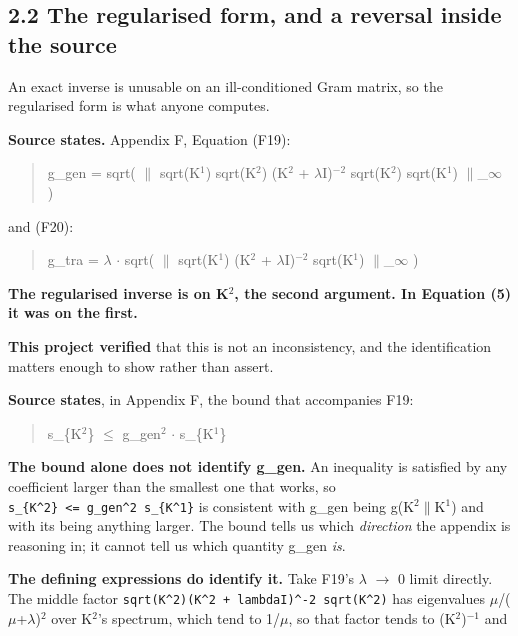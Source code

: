 \documentclass[
  10pt,
]{article}
\begin{document}
\subsection{2.2 The regularised form, and a reversal inside the
source}\label{the-regularised-form-and-a-reversal-inside-the-source}

An exact inverse is unusable on an ill-conditioned Gram matrix, so the
regularised form is what anyone computes.

\textbf{Source states.} Appendix F, Equation (F19):

\begin{quote}
g\_gen = sqrt( \(\|\) sqrt(K\(^{1}\)) sqrt(K\(^{2}\)) (K\(^{2}\) +
\(\lambda\)I)\(^{-2}\) sqrt(K\(^{2}\)) sqrt(K\(^{1}\))
\(\|\)\_\(\infty\) )
\end{quote}

and (F20):

\begin{quote}
g\_tra = \(\lambda\) \(\cdot\) sqrt( \(\|\) sqrt(K\(^{1}\)) (K\(^{2}\) +
\(\lambda\)I)\(^{-2}\) sqrt(K\(^{1}\)) \(\|\)\_\(\infty\) )
\end{quote}

\textbf{The regularised inverse is on K\(^{2}\), the second argument. In
Equation (5) it was on the first.}

\textbf{This project verified} that this is not an inconsistency, and
the identification matters enough to show rather than assert.

\textbf{Source states}, in Appendix F, the bound that accompanies F19:

\begin{quote}
s\_\{K\(^{2}\)\} \(\le\) g\_gen\(^{2}\) \(\cdot\) s\_\{K\(^{1}\)\}
\end{quote}

\textbf{The bound alone does not identify g\_gen.} An inequality is
satisfied by any coefficient larger than the smallest one that works, so
\texttt{s\_\allowbreak{}\{K\^{}2\}\ \textless{}=\ g\_gen\^{}2\ s\_\{K\^{}1\}} is
consistent with g\_gen being g(K\(^{2}\)\(\|\)K\(^{1}\)) and with its
being anything larger. The bound tells us which \emph{direction} the
appendix is reasoning in; it cannot tell us which quantity g\_gen
\emph{is}.

\textbf{The defining expressions do identify it.} Take F19's \(\lambda\)
\(\to\) 0 limit directly. The middle factor
\texttt{sqrt(K\^{}2)(K\^{}2\ +\ lambdaI)\^{}-2\ sqrt(K\^{}2)} has
eigenvalues \(\mu\)/(\(\mu\)+\(\lambda\))\(^{2}\) over K\(^{2}\)'s
spectrum, which tend to 1/\(\mu\), so that factor tends to
(K\(^{2}\))\(^{-1}\) and
\end{document}
